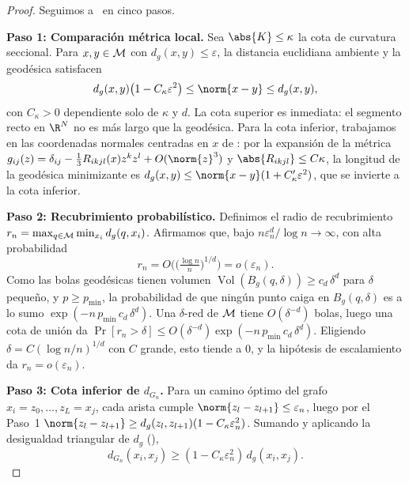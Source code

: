\begin{proof}
Seguimos a~\citet{bernstein2000graph} en cinco pasos.

\textbf{Paso 1: Comparaci\'on m\'etrica local.} Sea $\abs{K} \le \kappa$ la cota
de curvatura seccional. Para $x, y \in \mathcal{M}$ con $d_g(x,y) \le \varepsilon$, la
distancia euclidiana ambiente y la geod\'esica satisfacen
\begin{equation}
\label{eq:geo:local-comparison}
  d_g(x,y)\big(1 - C_\kappa \varepsilon^2\big) \le \norm{x - y} \le d_g(x,y),
\end{equation}
con $C_\kappa > 0$ dependiente solo de $\kappa$ y $d$. La cota superior es
inmediata: el segmento recto en $\R^N$ no es m\'as largo que la geod\'esica. Para
la cota inferior, trabajamos en las coordenadas normales centradas en $x$ de
: por la expansi\'on de la m\'etrica
$g_{ij}(z) = \delta_{ij} - \tfrac13 R_{ikjl}(x)z^k z^l + O(\norm{z}^3)$ y
$\abs{R_{ikjl}} \le C\kappa$, la longitud de la geod\'esica minimizante es
$d_g(x,y) \le \norm{x-y}(1 + C'_\kappa \varepsilon^2)$, que se invierte a la cota
inferior.

\textbf{Paso 2: Recubrimiento probabil\'istico.} Definimos el radio de
recubrimiento $r_n = \max_{q \in \mathcal{M}} \min_{x_i} d_g(q, x_i)$. Afirmamos que, bajo
$n\varepsilon_n^d/\log n \to \infty$, con alta probabilidad
\begin{equation}
\label{eq:geo:covering}
  r_n = O\!\Big(\big(\tfrac{\log n}{n}\big)^{1/d}\Big) = o(\varepsilon_n).
\end{equation}
Como las bolas geod\'esicas tienen volumen
$\operatorname{Vol}(B_g(q,\delta)) \ge c_d\,\delta^d$ para $\delta$ peque\~no, y
$p \ge p_{\min}$, la probabilidad de que ning\'un punto caiga en
$B_g(q,\delta)$ es a lo sumo $\exp(-n\,p_{\min}\,c_d\,\delta^d)$. Una
$\delta$-red de $\mathcal{M}$ tiene $O(\delta^{-d})$ bolas, luego una cota de uni\'on da
$\Pr[r_n > \delta] \le O(\delta^{-d})\exp(-n\,p_{\min}\,c_d\,\delta^d)$.
Eligiendo $\delta = C(\log n / n)^{1/d}$ con $C$ grande, esto tiende a $0$, y la
hip\'otesis de escalamiento da $r_n = o(\varepsilon_n)$.

\textbf{Paso 3: Cota inferior de $d_{G_n}$.} Para un camino \'optimo del grafo
$x_i = z_0, \dots, z_L = x_j$, cada arista cumple
$\norm{z_l - z_{l+1}} \le \varepsilon_n$, luego por el Paso~1
$\norm{z_l - z_{l+1}} \ge d_g(z_l, z_{l+1})(1 - C_\kappa \varepsilon_n^2)$.
Sumando y aplicando la desigualdad triangular de $d_g$
(),
\begin{equation}
\label{eq:geo:lower-dGn}
  d_{G_n}(x_i, x_j) \ge (1 - C_\kappa \varepsilon_n^2)\, d_g(x_i, x_j).
\end{equation}


\end{proof}
